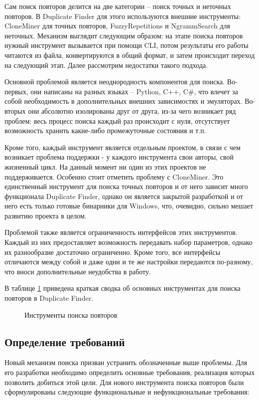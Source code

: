 \documentclass[14pt]{matmex-diploma-custom}
\begin{document}
Сам поиск повторов делится на две категории -- поиск точных и неточных повторов. В Duplicate Finder для этого используются внешние инструменты: CloneMiner \cite{bib:tool:CloneMiner} для точных повторов, FuzzyRepetitions \cite{bib:tool:FuzzySearch} и NgrammSearch \cite{bib:tool:ImprovedNgramSearch} для неточных. Механизм выглядит следующим образом: на этапе поиска повторов нужный инструмент вызывается при помощи CLI, потом результаты его работы читаются из файла, конвертируются в общий формат, и затем происходит переход на следующий этап. Далее рассмотрим недостатки такого подхода.

Основной проблемой является неоднородность компонентов для поиска. Во-первых, они написаны на разных языках -- Python, C++, C\#, что влечет за собой необходимость в дополнительных внешних зависимостях и эмуляторах. Во-вторых они абсолютно изолированы друг от друга, из-за чего возникает ряд проблем: весь процесс поиска каждый раз происходит с нуля, отсутствует возможность хранить какие-либо промежуточные состояния и т.п.

Кроме того, каждый инструмент является отдельным проектом, в связи с чем возникает проблема поддержки -  у каждого инструмента свои авторы, свой жизненный цикл. На данный момент ни один из этих проектов не поддерживается. Особенно стоит отметить проблему с CloneMiner. Это единственный инструмент для поиска точных повторов и от него зависит много функционала Duplicate Finder, однако он является закрытой разработкой и от него есть только готовые бинарники для Windows, что, очевидно, сильно мешает развитию проекта в целом.

Проблемой также является ограниченность интерфейсов этих инструментов. Каждый из них предоставляет возможность передавать набор параметров, однако их разнообразие достаточно ограниченно. Кроме того, все интерфейсы отличаются между собой и даже одни и те же настройки передаются по-разному, что вноси дополнительные неудобства в работу.


В таблице \ref{table:SearchTools} приведена краткая сводка об основных инструментах для поиска повторов в Duplicate Finder.

\begin{figure}[h!]
	\centering
	
	\caption{Инструменты поиска повторов}
	\label{table:SearchTools}
\end{figure}

\subsection{Определение требований}
Новый механизм поиска призван устранить обозначенные выше проблемы. Для его разработки необходимо определить основные требования, реализация которых позволить добиться этой цели. Для нового инструмента поиска повторов были сформулированы следующие функциональные и нефункциональные требования:
\end{document}
